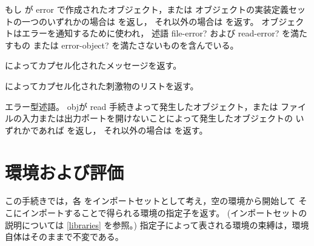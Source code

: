 \begin{entry}{%
}

もし  が {\cf error} で作成されたオブジェクト，または
オブジェクトの実装定義セットの一つのいずれかの場合は \schtrue{} を返し，
それ以外の場合は \schfalse{} を返す。
オブジェクトはエラーを通知するために使われ，
述語 {\cf file-error?} および {\cf read-error?} を満たすもの
または {\cf error-object?} を満たさないものを含んでいる。

\end{entry}

\begin{entry}{%
}

 によってカプセル化されたメッセージを返す。

\end{entry}

\begin{entry}{%
}

 によってカプセル化された刺激物のリストを返す。

\end{entry}

\begin{entry}{%
}

エラー型述語。
objが {\cf read} 手続きよって発生したオブジェクト，または
ファイルの入力または出力ポートを開けないことによって発生したオブジェクトの
いずれかであれば \schtrue{} を返し，
それ以外の場合は \schfalse{} を返す。

\end{entry}

\section{環境および評価}

\begin{entry}{%
}
\label{environments}

この手続きでは，各  をインポートセットとして考え，空の環境から開始して
そこにインポートすることで得られる環境の指定子を返す。
(インポートセットの説明については \ref{libraries} を参照。)
指定子によって表される環境の束縛は，環境自体はそのままで不変である。
\end{entry}

